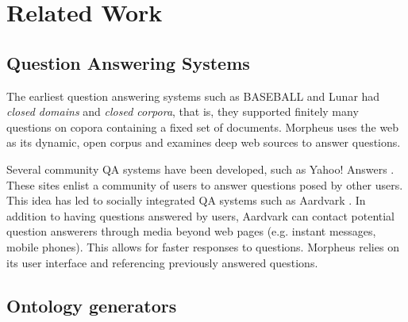 \section{Related Work}
\label{sec:relatedwork}

\subsection{Question Answering Systems} 

The earliest question answering systems such as BASEBALL \cite{Green1961} and Lunar \cite{woods1973} had \emph{closed domains} and \emph{closed corpora}, that is, they supported finitely many questions on copora containing a fixed set of documents. Morpheus uses the web as its dynamic, open corpus and examines deep web sources to answer questions.

Several community QA systems have been developed, such as Yahoo! Answers \cite{yahooanswers2008}. These sites enlist a community of users to answer questions posed by other users.  This idea has led to socially integrated QA systems such as Aardvark \cite{vark2010}. In addition to having questions answered by users, Aardvark can contact potential question answerers through media beyond web pages (e.g. instant messages, mobile phones).  This allows for faster responses to questions.  Morpheus relies on its user interface and referencing previously answered questions.

\subsection{Ontology generators} 
\label{sec:ontology_generators}




